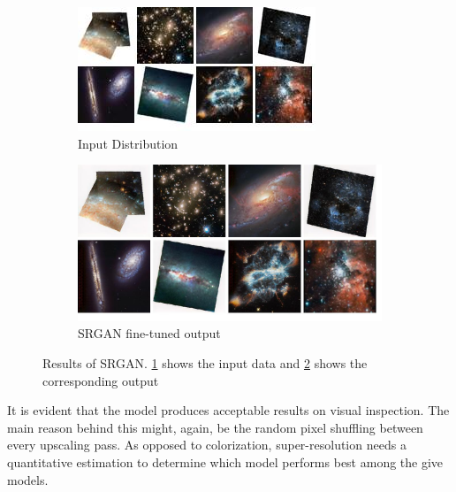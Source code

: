 \documentclass{article} %
\begin{document}
    \begin{figure}[!htb]
    	\centering
    	\begin{subfigure}[b]{0.4\textwidth}
    		\centering
    		\includegraphics[width=\textwidth]{figures/inputsamples_superR}
    		\caption{Input Distribution}
    		\label{fig: sr_input_samples}
    	\end{subfigure}
    	\begin{subfigure}[b]{0.4\textwidth}
    		\centering
    		\includegraphics[width=\textwidth]{figures/samples_SRGAN}
    		\caption{SRGAN fine-tuned output}
    		\label{fig: sr__outputs}
    	\end{subfigure}
    	\caption{Results of SRGAN. \ref{fig: sr_input_samples} shows the input data and \ref{fig: sr__outputs} shows the corresponding output}
    	\label{fig: sr_comparisons}
    \end{figure}
    It is evident that the model produces acceptable results on visual inspection. The main reason behind this might, again, be the random pixel shuffling between every upscaling pass. 
    As opposed to colorization, super-resolution needs a quantitative estimation to determine which model performs best among the give models. 
    
\end{document}
